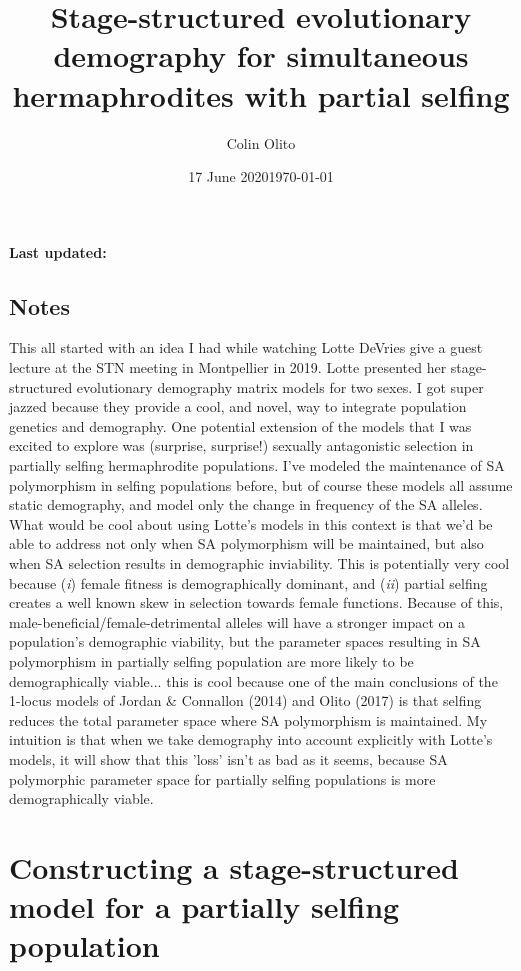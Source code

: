 \documentclass[11pt]{article}
\begin{document}
\title{Stage-structured evolutionary demography for simultaneous hermaphrodites with partial selfing}
\author{Colin Olito}
\date{17 June 2020}
\maketitle

\textbf{Last updated:} \date{\today}

\subsection*{Notes}

This all started with an idea I had while watching Lotte DeVries give a guest lecture at the STN meeting in Montpellier in 2019. Lotte presented her stage-structured evolutionary demography matrix models for two sexes. I got super jazzed because they provide a cool, and novel, way to integrate population genetics and demography. One potential extension of the models that I was excited to explore was (surprise, surprise!) sexually antagonistic selection in partially selfing hermaphrodite populations. I've modeled the maintenance of SA polymorphism in selfing populations before, but of course these models all assume static demography, and model only the change in frequency of the SA alleles. What would be cool about using Lotte's models in this context is that we'd be able to address not only when SA polymorphism will be maintained, but also when SA selection results in demographic inviability. This is potentially very cool because ({\itshape i}) female fitness is demographically dominant, and ({\itshape ii}) partial selfing creates a well known skew in selection towards female functions. Because of this, male-beneficial/female-detrimental alleles will have a stronger impact on a population's demographic viability, but the parameter spaces resulting in SA polymorphism in partially selfing population are more likely to be demographically viable... this is cool because one of the main conclusions of the 1-locus models of Jordan \& Connallon (2014) and Olito (2017) is that selfing reduces the total parameter space where SA polymorphism is maintained. My intuition is that when we take demography into account explicitly with Lotte's models, it will show that this 'loss' isn't as bad as it seems, because SA polymorphic parameter space for partially selfing populations is more demographically viable.
\bigskip

\section{Constructing a stage-structured model for a partially selfing population}
		
\end{document}
